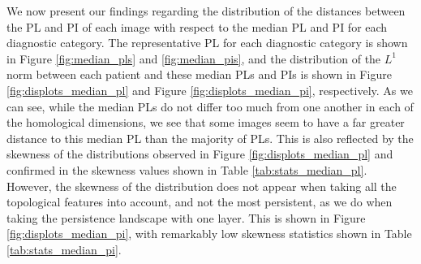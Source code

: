 \documentclass{article}
\begin{document}
We now present our findings regarding the distribution of the distances between the PL and PI of each image with respect to the median PL and PI for each diagnostic category. The representative PL for each diagnostic category is shown in Figure \ref{fig:median_pls} and \ref{fig:median_pis}, and the distribution of the $L^1$ norm between each patient and these median PLs and PIs is shown in Figure \ref{fig:displots_median_pl} and Figure \ref{fig:displots_median_pi}, respectively. As we can see, while the median PLs do not differ too much from one another in each of the homological dimensions, we see that some images seem to have a far greater distance to this median PL than the majority of PLs. This is also reflected by the skewness of the distributions observed in Figure \ref{fig:displots_median_pl} and confirmed in the skewness values shown in Table \ref{tab:stats_median_pl}. However, the skewness of the distribution does not appear when taking all the topological features into account, and not the most persistent, as we do when taking the persistence landscape with one layer. This is shown in Figure \ref{fig:displots_median_pi}, with remarkably low skewness statistics shown in Table \ref{tab:stats_median_pi}.
\end{document}
